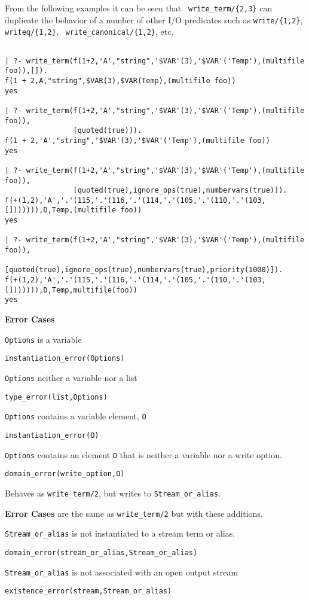 \begin{description}
From the following examples it can be seen that {\tt
write\_term/\{2,3\}} can duplicate the behavior of a number of other
I/O predicates such as {\tt write/\{1,2\}}, {\tt writeq/\{1,2\}}, {\tt
write\_canonical/\{1,2\}}, etc.
{\small
\begin{verbatim}

| ?- write_term(f(1+2,'A',"string",'$VAR'(3),'$VAR'('Temp'),(multifile foo)),[]).
f(1 + 2,A,"string",$VAR(3),$VAR(Temp),(multifile foo))
yes

| ?- write_term(f(1+2,'A',"string",'$VAR'(3),'$VAR'('Temp'),(multifile foo)),
                [quoted(true)]).
f(1 + 2,'A',"string",'$VAR'(3),'$VAR'('Temp'),(multifile foo))
yes

| ?- write_term(f(1+2,'A',"string",'$VAR'(3),'$VAR'('Temp'),(multifile foo)),
                [quoted(true),ignore_ops(true),numbervars(true)]).
f(+(1,2),'A','.'(115,'.'(116,'.'(114,'.'(105,'.'(110,'.'(103,[])))))),D,Temp,(multifile foo))
yes

| ?- write_term(f(1+2,'A',"string",'$VAR'(3),'$VAR'('Temp'),(multifile foo)),
                [quoted(true),ignore_ops(true),numbervars(true),priority(1000)]).
f(+(1,2),'A','.'(115,'.'(116,'.'(114,'.'(105,'.'(110,'.'(103,[])))))),D,Temp,multifile(foo))
yes
\end{verbatim}
}

{\bf Error Cases} 
\bi
\item 	{\tt Options} is a variable
\bi
\item    {\tt instantiation\_error(Options)}
\ei
\item 	{\tt Options} neither a variable nor a list
\bi
\item    {\tt type\_error(list,Options)}
\ei
\item 	{\tt Options} contains a variable element, {\tt O}
\bi
\item    {\tt instantiation\_error(O)}
\ei
\item 	{\tt Options} contains an element {\tt O} that is neither a variable
nor a write option.
\bi
\item    {\tt domain\_error(write\_option,O)}
\ei
\ei

% 
Behaves as {\tt write\_term/2}, but writes to {\tt Stream\_or\_alias}.

{\bf Error Cases} are the same as {\tt write\_term/2} but with these
additions.
\bi
\item 	{\tt Stream\_or\_alias} is not instantiated to a stream term
or alias.
\bi
\item 	{\tt domain\_error(stream\_or\_alias,Stream\_or\_alias)}
\ei
\item 	{\tt Stream\_or\_alias} is not associated with an open output stream
\bi
\item 	{\tt existence\_error(stream,Stream\_or\_alias)}
\ei
\ei



\end{description}
